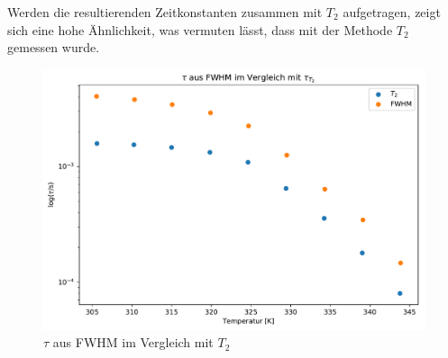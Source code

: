 Werden die resultierenden Zeitkonstanten zusammen mit $T_2$ aufgetragen, zeigt sich eine hohe Ähnlichkeit, was vermuten lässt, dass mit der Methode $T_2$ gemessen wurde.
\begin{figure}
	\begin{center}
		\includegraphics[width=\textwidth]{graphics/plots/SPEKDYN/spekdyn_t2.pdf}
	\end{center}
	\caption{$\tau$ aus FWHM im Vergleich mit $T_2$} \label{fig:res:spekdyn_t2}
\end{figure}
